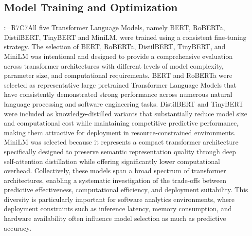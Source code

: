 \documentclass[a4paper,fleqn]{cas-sc}
\makeatletter
\newif\iftracked
\newcommand{\rv@setcolour}[1]{%
  \IfStrEq{#1}{R7C7}{\color{rvEdit}}{%
    \IfSubStr{#1}{R5}{\IfSubStr{#1}{R7}{\color{rvBoth}}{\color{rvFive}}}{\color{rvSeven}}}}
\newcommand{\rv@tag}[1]{\textsuperscript{\sffamily\bfseries\scriptsize[\StrSubstitute{#1}{,}{, }]}\,}
\newcommand{\rv@recordone}[1]{%
  \edef\rv@i{#1}%
  \ifcsdef{rv@n@\rv@i}{}{\csgdef{rv@n@\rv@i}{0}}%
  \csxdef{rv@n@\rv@i}{\the\numexpr\csuse{rv@n@\rv@i}+1\relax}%
  \begingroup\edef\@currentlabel{\rv@i}\label{rv:\rv@i:\csuse{rv@n@\rv@i}}\endgroup}
\newcommand{\rv@record}[1]{\@for\rv@id:=#1\do{\expandafter\rv@recordone\expandafter{\rv@id}}}
\DeclareRobustCommand{\rcrep}[3]{\rv@record{#1}\iftracked{\rv@setcolour{#1}\rv@tag{#1}\rv@strike{#2} #3}\else#3\fi}
\makeatother
\begin{document}
\subsection{Model Training and Optimization}
\rcrep{R7C7}{All Transformer Language Models, including BERT, RoBERTa, DistilBERT, and TinyBERT,}{All five Transformer Language Models, namely BERT, RoBERTa, DistilBERT, TinyBERT and MiniLM,} were trained using a consistent fine-tuning strategy. The selection of BERT, RoBERTa, DistilBERT, TinyBERT, and MiniLM was intentional and designed to provide a comprehensive evaluation across transformer architectures with different levels of model complexity, parameter size, and computational requirements. BERT and RoBERTa were selected as representative large pretrained Transformer Language Models that have consistently demonstrated strong performance across numerous natural language processing and software engineering tasks. DistilBERT and TinyBERT were included as knowledge-distilled variants that substantially reduce model size and computational cost while maintaining competitive predictive performance, making them attractive for deployment in resource-constrained environments. MiniLM was selected because it represents a compact transformer architecture specifically designed to preserve semantic representation quality through deep self-attention distillation while offering significantly lower computational overhead. Collectively, these models span a broad spectrum of transformer architectures, enabling a systematic investigation of the trade-offs between predictive effectiveness, computational efficiency, and deployment suitability. This diversity is particularly important for software analytics environments, where deployment constraints such as inference latency, memory consumption, and hardware availability often influence model selection as much as predictive accuracy.
\end{document}
